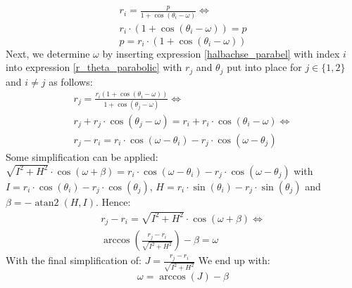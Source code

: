 \documentclass[11pt,a4paper]{article}
\DeclareMathOperator{\atantwo}{atan2}
\begin{document}
	\begin{equation*}
		\begin{aligned}
			r_i=\frac{p}{1+\cos(\theta_i-\omega)} \Leftrightarrow \\
			r_i\cdot(1+\cos(\theta_i-\omega))=p
		\end{aligned}
	\end{equation*}
	\begin{equation}\label{halbachse_parabel}
		\boxed{p=r_i\cdot(1+\cos(\theta_i-\omega))}
	\end{equation}
	\noindent
	Next, we determine $\omega$ by inserting expression \ref{halbachse_parabel} with index $i$ into expression \ref{r_theta_parabolic} with $r_j$ and $\theta_j$ put into place for $j \in \{1, 2\}$ and $i\neq j$ as follows:
	\begin{equation*}
		\begin{aligned}
			r_j=\frac{r_i(1+\cos(\theta_i-\omega))}{1+\cos(\theta_j-\omega)} \Leftrightarrow \\
			r_j+r_j\cdot\cos(\theta_j-\omega)=r_i+r_i\cdot\cos(\theta_i-\omega) \Leftrightarrow \\
			r_j-r_i=r_i\cdot\cos(\omega-\theta_i)-r_j\cdot\cos(\omega-\theta_j)
		\end{aligned}
	\end{equation*}
	\noindent
	Some simplification can be applied:\newline
	$\sqrt{I^2+H^2}\cdot\cos(\omega+\beta) = r_i\cdot\cos(\omega-\theta_i)-r_j\cdot\cos(\omega-\theta_j)$ with\newline $I=r_i\cdot\cos(\theta_i)-r_j\cdot\cos(\theta_j)$, $H=r_i\cdot\sin(\theta_i)-r_j\cdot\sin(\theta_j)$ and\newline $\beta=-\atantwo(H, I)$.\newline
	Hence:
	\begin{equation*}
		\begin{aligned}
			r_j-r_i=\sqrt{I^2+H^2}\cdot\cos(\omega+\beta) \Leftrightarrow \\
			\arccos\left(\frac{r_j-r_i}{\sqrt{I^2+H^2}}\right)-\beta=\omega
		\end{aligned}
	\end{equation*}
	With the final simplification of: \newline
	$J=\frac{r_j-r_i}{\sqrt{I^2+H^2}}$\newline
	We end up with:
	\begin{equation}
		\label{arg_peri_parabola}
		\boxed{\omega=\arccos(J)-\beta}
	\end{equation}
	\noindent
\end{document}
